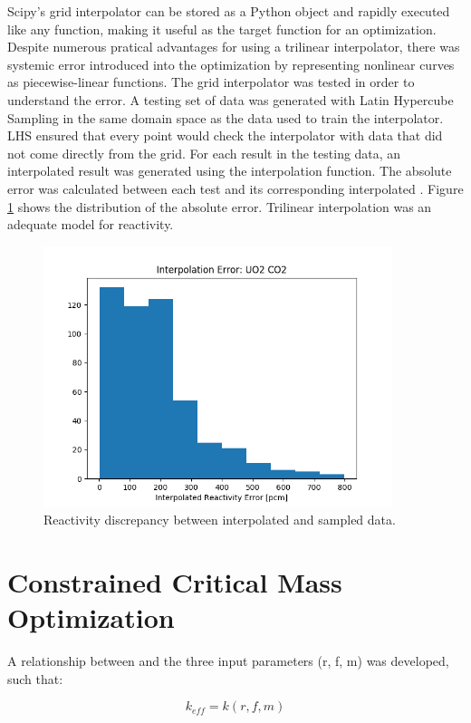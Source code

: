 Scipy's grid interpolator can be stored as a Python object and rapidly executed like any
function, making it useful as the target function for an
optimization. Despite numerous pratical advantages for using a trilinear
interpolator, there was systemic error introduced into the optimization by
representing nonlinear curves as piecewise-linear functions. The grid
interpolator was tested in order to understand the error. A testing set of data 
was generated with Latin Hypercube Sampling in the same 
domain space as the data used to train the interpolator. LHS ensured that every
point would check the interpolator with data that did not come directly from
the grid. For each \keff result in the
testing data, an interpolated result was generated using the interpolation
function. The absolute error was calculated
between each test \keff and its corresponding interpolated \keff. Figure
\ref{fig:interp_check} shows the distribution of the absolute error. Trilinear
interpolation was an adequate model for reactivity.

\begin{figure}[h]
    \centering
    \includegraphics[width=4in]{../images/check_uo2_co2.png}
\caption{Reactivity discrepancy between interpolated and sampled data.}
\label{fig:interp_check}
\end{figure}

\section{Constrained Critical Mass Optimization}\label{sec:crit_rad_search}
A relationship between \keff and the three input
parameters (r, f, m) was developed, such that:

\begin{equation}
    k_{eff} = k(r, f, m)
\label{eq:gen_keff}
\end{equation}

